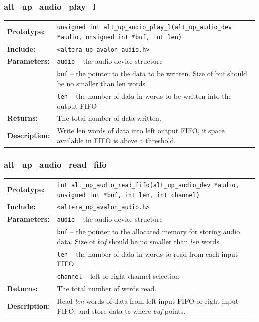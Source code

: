 \subsubsection{alt\_up\_audio\_play\_l}
\begin{tabular}[ht]{lp{11cm}}
	\textbf{Prototype:}
	&
	\texttt{unsigned int alt\_up\_audio\_play\_l(alt\_up\_audio\_dev *audio, unsigned int *buf, int len)} 
	\\
	\textbf{Include:}
	&
	{\tt <altera\_up\_avalon\_audio.h>}
	\\
	{\textbf{Parameters:}}
	&
	\texttt{{audio}}
	 -- the audio device structure 
	\\
	&
	\texttt{{buf}}
	 -- the pointer to the data to be written. Size of buf should be no smaller than len words. 
	\\
	&
	\texttt{{len}}
	 -- the number of data in words to be written into the output FIFO 
	\\
	\textbf{Returns:}
	& The total number of data written.
	\\
	\textbf{Description:}
	& Write len words of data into left output FIFO, if space available in FIFO is above a threshold.\\
\end{tabular}
\vfill

\subsubsection{alt\_up\_audio\_read\_fifo}
\begin{tabular}[ht]{lp{11cm}}
	\textbf{Prototype:}
	&
	\texttt{int alt\_up\_audio\_read\_fifo(alt\_up\_audio\_dev *audio, unsigned int *buf, int len, int channel)} 
	\\
	\textbf{Include:}
	&
	{\tt <altera\_up\_avalon\_audio.h>}
	\\
	{\textbf{Parameters:}}
	&
	\texttt{{audio}}
	 -- the audio device structure 
	\\
	&
	\texttt{{buf}}
	 -- the pointer to the allocated memory for storing audio data. Size of {\it buf} should be no smaller than {\it len} words. 
	\\
	&
	\texttt{{len}}
	 -- the number of data in words to read from each input FIFO 
	\\
	&
	\texttt{{channel}}
	 -- left or right channel selection 
	\\
	\textbf{Returns:}
	& The total number of words read.
	\\
	\textbf{Description:}
	& Read {\it len} words of data from left input FIFO or right input FIFO, and store data to where {\it buf} points.\\
\end{tabular}
\vfill

